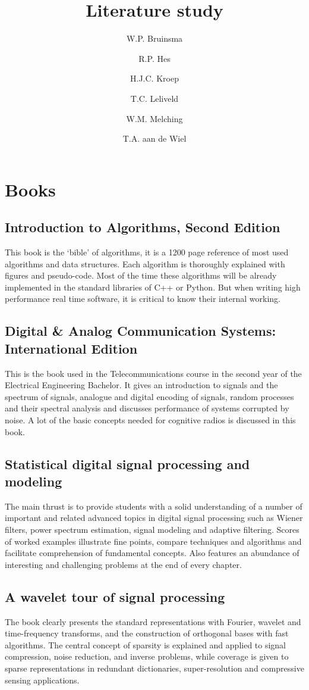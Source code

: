\documentclass[report, oneside, a4paper, openany]{memoir}
\title{Literature study}
\author{W.P. Bruinsma \and R.P. Hes \and H.J.C. Kroep \and T.C. Leliveld \and W.M. Melching \and T.A. aan de Wiel}
\begin{document}
\chapter{Books}

\section{Introduction to Algorithms, Second Edition \cite{cormen2001introduction}}
This book is the `bible' of algorithms, it is a 1200 page reference of most used algorithms and data structures. Each algorithm is thoroughly explained with figures and pseudo-code. Most of the time these algorithms will be already implemented in the standard libraries of C++ or Python. But when writing high performance real time software, it is critical to know their internal working.
\section{Digital \& Analog Communication Systems: International Edition \cite{couch2013digital}}
This is the book used in the Telecommunications course in the second year of the Electrical Engineering Bachelor. It gives an introduction to signals and the spectrum of signals, analogue and digital encoding of signals, random processes and their spectral analysis and discusses performance of systems corrupted by noise. A lot of the basic concepts needed for cognitive radios is discussed in this book. 
\section{Statistical digital signal processing and modeling \cite{hayes1996statistical}}
The main thrust is to provide students with a solid understanding of a number of important and related advanced topics in digital signal processing such as Wiener filters, power spectrum estimation, signal modeling and adaptive filtering. Scores of worked examples illustrate fine points, compare techniques and algorithms and facilitate comprehension of fundamental concepts. Also features an abundance of interesting and challenging problems at the end of every chapter.
\section{A wavelet tour of signal processing \cite{mallat1999wavelet}}
The book clearly presents the standard representations with Fourier, wavelet and time-frequency transforms, and the construction of orthogonal bases with fast algorithms. The central concept of sparsity is explained and applied to signal compression, noise reduction, and inverse problems, while coverage is given to sparse representations in redundant dictionaries, super-resolution and compressive sensing applications.
\end{document}
